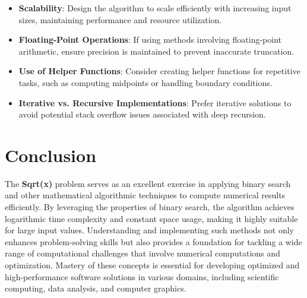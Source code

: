 \begin{itemize}
    \item \textbf{Scalability}: Design the algorithm to scale efficiently with increasing input sizes, maintaining performance and resource utilization.
    
    \item \textbf{Floating-Point Operations}: If using methods involving floating-point arithmetic, ensure precision is maintained to prevent inaccurate truncation.
    
    \item \textbf{Use of Helper Functions}: Consider creating helper functions for repetitive tasks, such as computing midpoints or handling boundary conditions.
    
    \item \textbf{Iterative vs. Recursive Implementations}: Prefer iterative solutions to avoid potential stack overflow issues associated with deep recursion.
\end{itemize}

\section*{Conclusion}

The \textbf{Sqrt(x)} problem serves as an excellent exercise in applying binary search and other mathematical algorithmic techniques to compute numerical results efficiently. By leveraging the properties of binary search, the algorithm achieves logarithmic time complexity and constant space usage, making it highly suitable for large input values. Understanding and implementing such methods not only enhances problem-solving skills but also provides a foundation for tackling a wide range of computational challenges that involve numerical computations and optimization. Mastery of these concepts is essential for developing optimized and high-performance software solutions in various domains, including scientific computing, data analysis, and computer graphics.

\printindex

% 
% 
% 
% 
% 